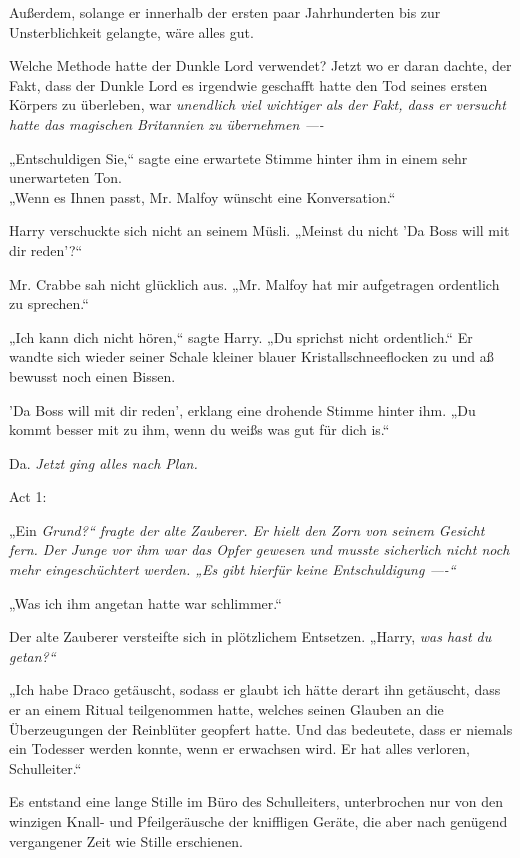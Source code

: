 {Außerdem, solange er innerhalb der ersten paar Jahrhunderten bis zur Unsterblichkeit gelangte, wäre alles gut.

Welche Methode hatte der Dunkle Lord verwendet? Jetzt wo er daran dachte, der Fakt, dass der Dunkle Lord es irgendwie geschafft hatte den Tod seines ersten Körpers zu überleben, war \emph{unendlich viel wichtiger als der Fakt, dass er versucht hatte das magischen Britannien zu übernehmen ----}

„Entschuldigen Sie,“ sagte eine erwartete Stimme hinter ihm in einem sehr unerwarteten Ton.\\ „Wenn es Ihnen passt, Mr. Malfoy wünscht eine Konversation.“

Harry verschuckte sich nicht an seinem Müsli. „Meinst du nicht 'Da Boss will mit dir reden'?“

Mr. Crabbe sah nicht glücklich aus. „Mr. Malfoy hat mir aufgetragen ordentlich zu sprechen.“

„Ich kann dich nicht hören,“ sagte Harry. „Du sprichst nicht ordentlich.“ Er wandte sich wieder seiner Schale kleiner blauer Kristallschneeflocken zu und aß bewusst noch einen Bissen.

'Da Boss will mit dir reden', erklang eine drohende Stimme hinter ihm. „Du kommt besser mit zu ihm, wenn du weißs was gut für dich is.“

Da. \emph{Jetzt ging alles nach Plan.}

Act 1:

„Ein \emph{Grund?“ fragte der alte Zauberer. Er hielt den Zorn von seinem Gesicht fern. Der Junge vor ihm war das Opfer gewesen und musste sicherlich nicht noch mehr eingeschüchtert werden. „Es gibt hierfür \emph{keine} Entschuldigung ----“}

„Was ich ihm angetan hatte war schlimmer.“

Der alte Zauberer versteifte sich in plötzlichem Entsetzen. „Harry, \emph{was hast du getan?“}

„Ich habe Draco getäuscht, sodass er glaubt ich hätte derart ihn getäuscht, dass er an einem Ritual teilgenommen hatte, welches seinen Glauben an die Überzeugungen der Reinblüter geopfert hatte. Und das bedeutete, dass er niemals ein Todesser werden konnte, wenn er erwachsen wird. Er hat alles verloren, Schulleiter.“

Es entstand eine lange Stille im Büro des Schulleiters, unterbrochen nur von den winzigen Knall- und Pfeilgeräusche der kniffligen Geräte, die aber nach genügend vergangener Zeit wie Stille erschienen.

}

